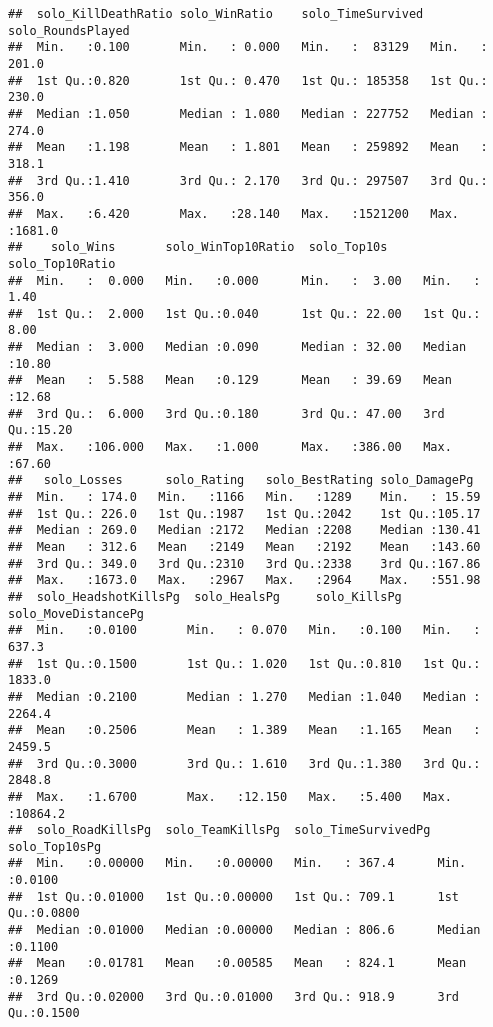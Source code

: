 \documentclass[]{article}
\begin{document}
\begin{verbatim}
##  solo_KillDeathRatio solo_WinRatio    solo_TimeSurvived solo_RoundsPlayed
##  Min.   :0.100       Min.   : 0.000   Min.   :  83129   Min.   : 201.0   
##  1st Qu.:0.820       1st Qu.: 0.470   1st Qu.: 185358   1st Qu.: 230.0   
##  Median :1.050       Median : 1.080   Median : 227752   Median : 274.0   
##  Mean   :1.198       Mean   : 1.801   Mean   : 259892   Mean   : 318.1   
##  3rd Qu.:1.410       3rd Qu.: 2.170   3rd Qu.: 297507   3rd Qu.: 356.0   
##  Max.   :6.420       Max.   :28.140   Max.   :1521200   Max.   :1681.0   
##    solo_Wins       solo_WinTop10Ratio  solo_Top10s     solo_Top10Ratio
##  Min.   :  0.000   Min.   :0.000      Min.   :  3.00   Min.   : 1.40  
##  1st Qu.:  2.000   1st Qu.:0.040      1st Qu.: 22.00   1st Qu.: 8.00  
##  Median :  3.000   Median :0.090      Median : 32.00   Median :10.80  
##  Mean   :  5.588   Mean   :0.129      Mean   : 39.69   Mean   :12.68  
##  3rd Qu.:  6.000   3rd Qu.:0.180      3rd Qu.: 47.00   3rd Qu.:15.20  
##  Max.   :106.000   Max.   :1.000      Max.   :386.00   Max.   :67.60  
##   solo_Losses      solo_Rating   solo_BestRating solo_DamagePg   
##  Min.   : 174.0   Min.   :1166   Min.   :1289    Min.   : 15.59  
##  1st Qu.: 226.0   1st Qu.:1987   1st Qu.:2042    1st Qu.:105.17  
##  Median : 269.0   Median :2172   Median :2208    Median :130.41  
##  Mean   : 312.6   Mean   :2149   Mean   :2192    Mean   :143.60  
##  3rd Qu.: 349.0   3rd Qu.:2310   3rd Qu.:2338    3rd Qu.:167.86  
##  Max.   :1673.0   Max.   :2967   Max.   :2964    Max.   :551.98  
##  solo_HeadshotKillsPg  solo_HealsPg     solo_KillsPg   solo_MoveDistancePg
##  Min.   :0.0100       Min.   : 0.070   Min.   :0.100   Min.   :  637.3    
##  1st Qu.:0.1500       1st Qu.: 1.020   1st Qu.:0.810   1st Qu.: 1833.0    
##  Median :0.2100       Median : 1.270   Median :1.040   Median : 2264.4    
##  Mean   :0.2506       Mean   : 1.389   Mean   :1.165   Mean   : 2459.5    
##  3rd Qu.:0.3000       3rd Qu.: 1.610   3rd Qu.:1.380   3rd Qu.: 2848.8    
##  Max.   :1.6700       Max.   :12.150   Max.   :5.400   Max.   :10864.2    
##  solo_RoadKillsPg  solo_TeamKillsPg  solo_TimeSurvivedPg solo_Top10sPg   
##  Min.   :0.00000   Min.   :0.00000   Min.   : 367.4      Min.   :0.0100  
##  1st Qu.:0.01000   1st Qu.:0.00000   1st Qu.: 709.1      1st Qu.:0.0800  
##  Median :0.01000   Median :0.00000   Median : 806.6      Median :0.1100  
##  Mean   :0.01781   Mean   :0.00585   Mean   : 824.1      Mean   :0.1269  
##  3rd Qu.:0.02000   3rd Qu.:0.01000   3rd Qu.: 918.9      3rd Qu.:0.1500  

\end{verbatim}
\end{document}
